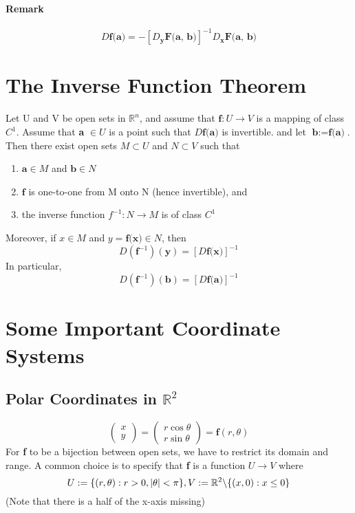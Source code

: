 \documentclass[11pt]{article}
\newcommand{\tb}[1]{\textbf{#1}}
\newcommand{\real}[0]{\mathbb{R}}
\newcommand{\func}[3]{\tb{#1}: {#2} \rightarrow {#3} }
\begin{document}
\paragraph{Remark} $$D\tb{f(a)} = -[D_\tb{y}\tb{F(a, b)}]^{-1}D_\tb{x}\tb{F(a, b)}$$
\section{The Inverse Function Theorem} Let U and V be open sets in $\real^n$, and assume that $\func{f}{U}{V}$ is a mapping of class $C^1$. \newline
Assume that \tb{a} $\in U$ is a point such that $D\tb{f(a)}$ is invertible. \newline
and let $\tb{b} := \tb{f(a)}$. Then there exist open sets $M \subset U$ and $N \subset V$ such that
\begin{enumerate}
    \item $\tb{a} \in M$ and $\tb{b} \in N$
    \item $\tb{f}$ is one-to-one from M onto N (hence invertible), and
    \item the inverse function $f^{-1}: N \rightarrow M$ is of class $C^1$
\end{enumerate}
Moreover, if $x \in M$ and $y = \tb{f(x)}\in N$, then $$D(\tb{f}^{-1})(\tb{y}) = [D\tb{f(x)}]^{-1}$$
In particular, $$D(\tb{f}^{-1})(\tb{b}) = [D\tb{f(a)}]^{-1}$$

\section{Some Important Coordinate Systems}
\subsection{Polar Coordinates in $\real^2$}
$$\begin{pmatrix}
    x\\y
\end{pmatrix}
= \begin{pmatrix}
    r\cos{\theta}\\
    r\sin{\theta}
\end{pmatrix}
= \tb{f}(r, \theta) $$
For \tb{f} to be a bijection between open sets, we have to restrict its domain and range. A common choice is to specify that \tb{f} is a function $U \rightarrow V$ where
$$U := \{(r, \theta): r > 0, |\theta| < \pi\},   V:= \real^2 \symbol{92}\{(x, 0): x \leq 0 \}$$
(Note that there is a half of the x-axis missing)
\end{document}

